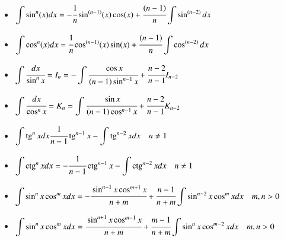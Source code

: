 \documentclass[twoside, a4paperpt, fleqn]{extarticle}
\begin{document}
\begin{itemize}
    \item $\displaystyle \int \sin ^{n}(x) d x=-\cfrac{1}{n} \sin ^{(n-1)}(x) \cos (x)+\cfrac{(n-1)}{n} \displaystyle \int \sin ^{(n-2)} d x $
    \item $\displaystyle \int \cos ^{n}(x) d x=\cfrac{1}{n} \cos ^{(n-1)}(x) \sin (x)+\cfrac{(n-1)}{n} \displaystyle \int \cos ^{(n-2)} d x $
    \item $\displaystyle \int \cfrac{d x}{\sin ^{n} x}=I_{n}=-\displaystyle \int \cfrac{\cos x}{(n-1) \sin ^{n-1} x}+\cfrac{n-2}{n-1} I_{n-2} $
    \item $\displaystyle \int \cfrac{d x}{\cos ^{n} x}=K_{n}=\displaystyle \int \cfrac{\sin x}{(n-1) \cos ^{n-1} x}+\cfrac{n-2}{n-1} K_{n-2} $
    \item $\displaystyle \int \operatorname{tg}^{n} x d x  \cfrac{1}{n-1} \operatorname{tg}^{n-1} x-\displaystyle \int \operatorname{tg}^{n-2} x d x \quad n \neq 1 $
    \item $\displaystyle \int \operatorname{ctg}^{n} x d x  =-\cfrac{1}{n-1} \operatorname{ctg}^{n-1} x-\displaystyle \int \operatorname{ctg}^{n-2} x d x \quad n \neq 1 $
    \item $\displaystyle \int \sin ^{n} x \cos ^{m} x d x=-\cfrac{\sin ^{n-1} x \cos ^{m+1} x}{n+m}+\cfrac{n-1}{n+m} \displaystyle \int \sin ^{n-2} x \cos ^{m} x d x \quad m, n>0 $
    \item $\displaystyle \int \sin ^{n} x \cos ^{m} x d x=\cfrac{\sin ^{n+1} x \cos ^{m-1} x}{n+m}+\cfrac{m-1}{n+m} \displaystyle \int \sin ^{n} x \cos ^{m-2} x d x \quad m, n>0$
\end{itemize}
\end{document}
